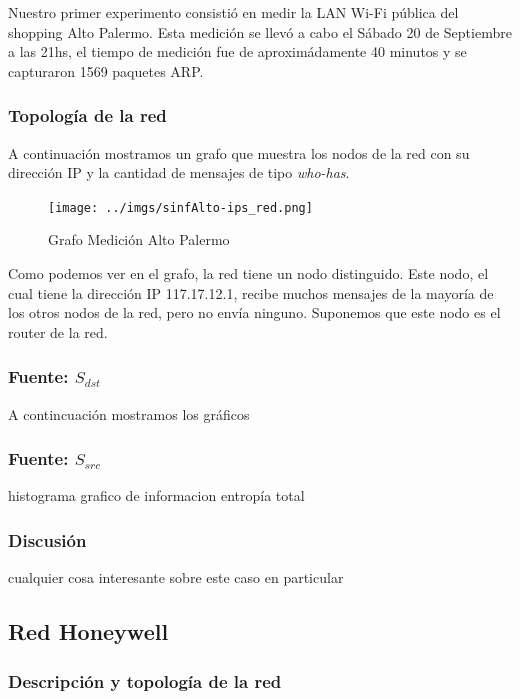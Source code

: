 \documentclass[10pt, a4paper]{article}
\begin{document}
Nuestro primer experimento consistió en medir la LAN Wi-Fi pública del shopping Alto Palermo. Esta medición se llevó a cabo el Sábado 20 de Septiembre a las 21hs, el tiempo de medición fue de aproximádamente 40 minutos y se capturaron 1569 paquetes ARP.


\subsubsection{Topología de la red}

A continuación mostramos un grafo que muestra los nodos de la red con su dirección IP y la cantidad de mensajes de tipo \emph{who-has}.

\begin{figure}
 \begin{center}
  \texttt{[image: ../imgs/sinfAlto-ips\_red.png]}
  \caption{Grafo Medición Alto Palermo}
 \end{center}

\end{figure}

Como podemos ver en el grafo, la red tiene un nodo distinguido. Este nodo, el cual tiene la dirección IP 117.17.12.1, recibe muchos mensajes de la mayoría de los otros nodos de la red, pero no envía ninguno. Suponemos que este nodo es el router de la red.

\subsubsection{Fuente: $S_{dst}$}

A contincuación mostramos los gráficos 

\subsubsection{Fuente: $S_{src}$}

histograma
grafico de informacion
entropía total

\subsubsection{Discusión}

cualquier cosa interesante sobre este caso en particular

\subsection{Red Honeywell}

\subsubsection{Descripción y topología de la red}
\end{document}

